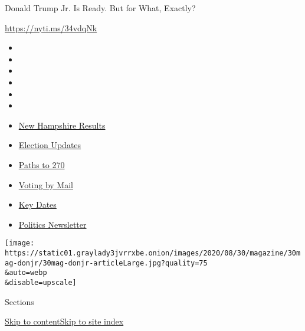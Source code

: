 Donald Trump Jr. Is Ready. But for What, Exactly?

\url{https://nyti.ms/34vdqNk}

\begin{itemize}
\item
\item
\item
\item
\item
\item
\end{itemize}

\begin{itemize}
\item
  \href{https://www.nytimes3xbfgragh.onion/interactive/2020/09/08/us/elections/results-new-hampshire-primary-elections.html?action=click\&pgtype=Article\&state=default\&region=TOP_BANNER\&context=storylines_menu}{New
  Hampshire Results}
\item
  \href{https://www.nytimes3xbfgragh.onion/live/2020/09/08/us/trump-vs-biden?action=click\&pgtype=Article\&state=default\&region=TOP_BANNER\&context=storylines_menu}{Election
  Updates}
\item
  \href{https://www.nytimes3xbfgragh.onion/interactive/2020/us/elections/election-states-biden-trump.html?action=click\&pgtype=Article\&state=default\&region=TOP_BANNER\&context=storylines_menu}{Paths
  to 270}
\item
  \href{https://www.nytimes3xbfgragh.onion/interactive/2020/08/31/us/politics/vote-by-mail-deadlines.html?action=click\&pgtype=Article\&state=default\&region=TOP_BANNER\&context=storylines_menu}{Voting
  by Mail}
\item
  \href{https://www.nytimes3xbfgragh.onion/interactive/2019/us/elections/2020-presidential-election-calendar.html?action=click\&pgtype=Article\&state=default\&region=TOP_BANNER\&context=storylines_menu}{Key
  Dates}
\item
  \href{https://www.nytimes3xbfgragh.onion/newsletters/politics?action=click\&pgtype=Article\&state=default\&region=TOP_BANNER\&context=storylines_menu}{Politics
  Newsletter}
\end{itemize}

\texttt{[image: https://static01.graylady3jvrrxbe.onion/images/2020/08/30/magazine/30mag-donjr/30mag-donjr-articleLarge.jpg?quality=75\\\&auto=webp\\\&disable=upscale]}

Sections

\protect\hyperlink{site-content}{Skip to
content}\protect\hyperlink{site-index}{Skip to site index}


